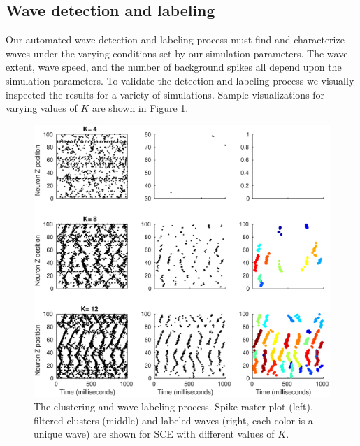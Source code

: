 \documentclass[12pt]{article}
\begin{document}
\subsection*{Wave detection and labeling}
\color{red}
Our automated wave detection and labeling process must find and characterize waves under the varying conditions set by our simulation parameters.
The wave extent, wave speed, and the number of background spikes all depend upon the simulation parameters.
To validate the detection and labeling process we visually inspected the results for a variety of simulations.
Sample visualizations for varying values of $K$ are shown in Figure \ref{fig:detector_test}.
\begin{figure}[!htb]
 \caption{The clustering and wave labeling process. Spike raster plot (left), filtered clusters (middle) and labeled waves (right, each color is a unique wave) are shown for SCE with different values of $K$. }
 \label{fig:detector_test}
 \centering
   \includegraphics[width=\textwidth]{fig/DetectorTest}
\end{figure}
\FloatBarrier
\color{black}

\clearpage

\color{red}
\end{document}
